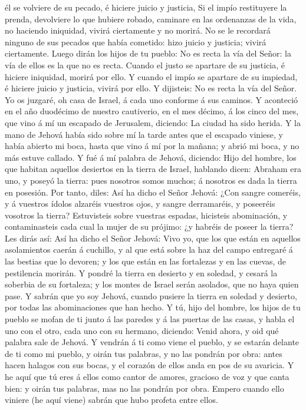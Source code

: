 él se volviere de su pecado, é hiciere juicio y justicia,
 Si el impío restituyere la prenda, devolviere lo que
hubiere robado, caminare en las ordenanzas de la vida, no haciendo
iniquidad, vivirá ciertamente y no morirá.  No se le
recordará ninguno de sus pecados que había cometido: hizo juicio y
justicia; vivirá ciertamente.  Luego dirán los hijos de
tu pueblo: No es recta la vía del Señor: la vía de ellos es la que no es
recta.  Cuando el justo se apartare de su justicia, é
hiciere iniquidad, morirá por ello.  Y cuando el impío se
apartare de su impiedad, é hiciere juicio y justicia, vivirá por ello.
 Y dijisteis: No es recta la vía del Señor. Yo os
juzgaré, oh casa de Israel, á cada uno conforme á sus caminos.
 Y aconteció en el año duodécimo de nuestro cautiverio,
en el mes décimo, á los cinco del mes, que vino á mí un escapado de
Jerusalem, diciendo: La ciudad ha sido herida.  Y la mano
de Jehová había sido sobre mí la tarde antes que el escapado viniese, y
había abierto mi boca, hasta que vino á mí por la mañana; y abrió mi
boca, y no más estuve callado.  Y fué á mí palabra de
Jehová, diciendo:  Hijo del hombre, los que habitan
aquellos desiertos en la tierra de Israel, hablando dicen: Abraham era
uno, y poseyó la tierra: pues nosotros somos muchos; á nosotros es dada
la tierra en posesión.  Por tanto, diles: Así ha dicho el
Señor Jehová: ¿Con sangre comeréis, y á vuestros ídolos alzaréis
vuestros ojos, y sangre derramaréis, y poseeréis vosotros la tierra?
 Estuvisteis sobre vuestras espadas, hicisteis
abominación, y contaminasteis cada cual la mujer de su prójimo: ¿y
habréis de poseer la tierra?  Les dirás así: Así ha dicho
el Señor Jehová: Vivo yo, que los que están en aquellos asolamientos
caerán á cuchillo, y al que está sobre la haz del campo entregaré á las
bestias que lo devoren; y los que están en las fortalezas y en las
cuevas, de pestilencia morirán.  Y pondré la tierra en
desierto y en soledad, y cesará la soberbia de su fortaleza; y los
montes de Israel serán asolados, que no haya quien pase. 
Y sabrán que yo soy Jehová, cuando pusiere la tierra en soledad y
desierto, por todas las abominaciones que han hecho.  Y
tú, hijo del hombre, los hijos de tu pueblo se mofan de ti junto á las
paredes y á las puertas de las casas, y habla el uno con el otro, cada
uno con su hermano, diciendo: Venid ahora, y oid qué palabra sale de
Jehová.  Y vendrán á ti como viene el pueblo, y se
estarán delante de ti como mi pueblo, y oirán tus palabras, y no las
pondrán por obra: antes hacen halagos con sus bocas, y el corazón de
ellos anda en pos de su avaricia.  Y he aquí que tú eres
á ellos como cantor de amores, gracioso de voz y que canta bien: y oirán
tus palabras, mas no las pondrán por obra.  Empero cuando
ello viniere (he aquí viene) sabrán que hubo profeta entre ellos.


